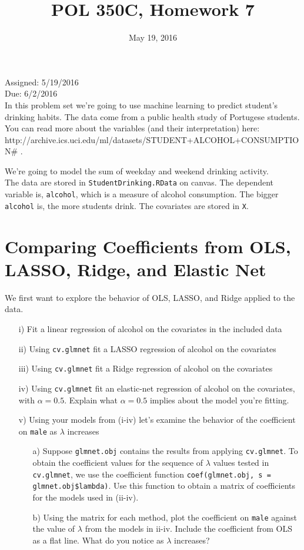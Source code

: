 \documentclass[letterpaper,12pt]{article}
\title{POL 350C, Homework 7}
\date{May 19, 2016}
\numberwithin{equation}{section}
\numberwithin{equation}{section}
\begin{document}
\maketitle

\noindent Assigned: 5/19/2016\\
Due: 6/2/2016\\

\noindent In this problem set we're going to use machine learning to predict student's drinking habits.  The data come from a public health study of Portugese students.  You can read more about the variables (and their interpretation) here: \\

http://archive.ics.uci.edu/ml/datasets/STUDENT+ALCOHOL+CONSUMPTION\# . 

\noindent We're going to model the sum of weekday and weekend drinking activity.    \\

\noindent The data are stored in {\tt StudentDrinking.RData} on canvas.  The dependent variable is, {\tt alcohol}, which is a measure of alcohol consumption.  The bigger {\tt alcohol} is, the more students drink.  The covariates are stored in {\tt X}.  

\section{Comparing Coefficients from OLS, LASSO, Ridge, and Elastic Net}

We first want to explore the behavior of OLS, LASSO, and Ridge applied to the data.  

\begin{itemize}
\item[i)] Fit a linear regression of alcohol on the covariates in the included data
\item[ii)] Using {\tt cv.glmnet} fit a LASSO regression of alcohol on the covariates
\item[iii)] Using {\tt cv.glmnet} fit a Ridge regression of alcohol on the covariates
\item[iv)] Using {\tt cv.glmnet} fit an elastic-net regression of alcohol on the covariates, with $\alpha = 0.5$.  Explain what $\alpha = 0.5$ implies about the model you're fitting.  
\item[v)] Using your models from (i-iv) let's examine the behavior of the coefficient on {\tt male} as $\lambda$ increases
\begin{itemize}
\item[a)] Suppose {\tt glmnet.obj} contains the results from applying {\tt cv.glmnet}.  To obtain the coefficient values for the sequence of $\lambda$ values tested in {\tt cv.glmnet}, we use the coefficient function {\tt coef(glmnet.obj, s = glmnet.obj\$lambda)}.  Use this function to obtain a matrix of coefficients for the models used in (ii-iv).  
\item[b)] Using the matrix for each method, plot the coefficient on {\tt male} against the value of $\lambda$ from the models in ii-iv.  Include the coefficient from OLS as a flat line.  What do you notice as $\lambda$ increases?  
\end{itemize} 
\end{itemize}
\end{document}
